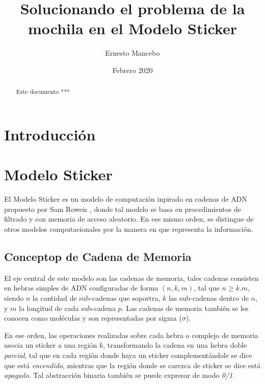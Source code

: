 \documentclass[12pt, letterpaper, twoside]{article}
\title{Solucionando el problema de la mochila en el Modelo Sticker}
\author{Ernesto Mancebo}
\date{Febrero 2020}
\begin{document}
    \maketitle
    \begin{abstract}
        Este documento ***
    \end{abstract}

    \section{Introducción}

    \section{Modelo Sticker}
    \par El Modelo Sticker es un modelo de computación inpirado en cadenas de ADN propuesto por Sam Roweis \cite{citation-13218946}, donde tal modelo se basa en procedimientos de filtrado y con memoria de acceso aleatorio. En ese mismo orden, se distingue de otros modelos computacionales por la manera en que representa la información.

    \subsection{Conceptop de Cadena de Memoria}

    \par El eje central de este modelo son las cadenas de memoria, tales cadenas consisten en hebras simples de ADN configuradas de forma $(n, k, m)$, tal que $n\geq k.m$, siendo $n$ la cantidad de sub-cadenas que soportra, $k$ las sub-cadenas dentro de $n$, y $m$ la longitud de cada sub-cadena $p$. Las cadenas de memoria también se les conocen como moléculas y son representadas por sigma ($\sigma$).
    \par En ese orden, las operaciones realizadas sobre cada hebra o complejo de memoria asocia un sticker a una región $k$, transformando la cadena en una hebra doble \emph{parcial}, tal que en cada región donde haya un sticker complementándole se dice que está \emph{encendido}, mientras que la región donde se carezca de sticker se dice está \emph{apagado}. Tal abstracción binaria también se puede expresar de modo \emph{0/1}.\\
\end{document}
